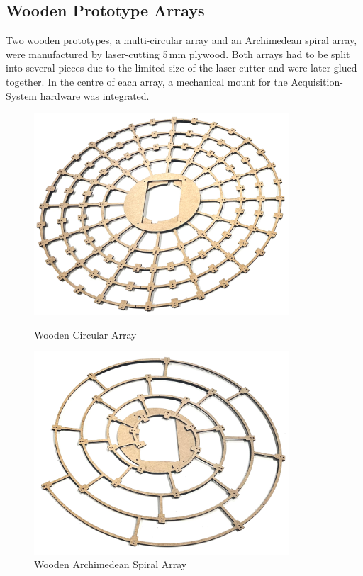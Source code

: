 \subsection{Wooden Prototype Arrays}
Two wooden prototypes, a multi-circular array and an Archimedean spiral array, were manufactured by laser-cutting 5\,mm plywood.
Both arrays had to be split into several pieces due to the limited size of the laser-cutter and were later glued together.
In the centre of each array, a mechanical mount for the Acquisition-System hardware was integrated.
\vspace{-0.1cm}
\begin{figure}[h!]
	\centering
	\begin{minipage}{0.49\textwidth}
		\centering
		\includegraphics[width=0.85\textwidth]{images/5_array_evaluation/wooden_circular_array.png}
		\caption{Wooden Circular Array}
		\label{fig:wooden_circular_array}
	\end{minipage}
	\begin{minipage}{0.49\textwidth}
		\centering
		\includegraphics[width=0.85\textwidth]{images/5_array_evaluation/wooden_archimedean_spiral_array.png}
		\caption{Wooden Archimedean Spiral Array}
		\label{fig:wooden_archimedean_spiral_array}
	\end{minipage}
\end{figure}
\vspace{-0.3cm}

